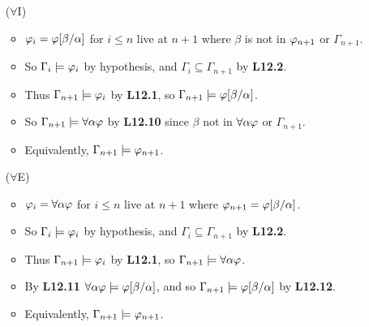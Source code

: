 \documentclass[a4paper, 11pt]{article} %
\begin{document}
\begin{enumerate}[labelsep=.1in]
  \item[($\forall$I)] %
    \begin{itemize}
      \item $\varphi_i=\varphi[\beta/\alpha]$ for $i\leq n$ live at $n+1$ where $\beta$ is not in $\varphi_{n+1}$ or $\Gamma_{n+1}$. 
      \item So $\Gamma_i\models\varphi_i$ by hypothesis, and $\Gamma_i\subseteq\Gamma_{n+1}$ by \textbf{L12.2}.
      \item Thus $\Gamma_{n+1}\models\varphi_i$ by \textbf{L12.1}, so $\Gamma_{n+1}\models\varphi[\beta/\alpha]$.
      \item So $\Gamma_{n+1}\models \forall \alpha\varphi$ by \textbf{L12.10} since $\beta$ not in $\forall \alpha\varphi$ or $\Gamma_{n+1}$.
      \item Equivalently, $\Gamma_{n+1}\models \varphi_{n+1}$.
    \end{itemize}
  \item[($\forall$E)] %
    \begin{itemize}
      \item $\varphi_i=\forall \alpha\varphi$ for $i\leq n$ live at $n+1$ where $\varphi_{n+1}=\varphi[\beta/\alpha]$.
      \item So $\Gamma_i\models\varphi_i$ by hypothesis, and $\Gamma_i\subseteq\Gamma_{n+1}$ by \textbf{L12.2}.
      \item Thus $\Gamma_{n+1}\models\varphi_i$ by \textbf{L12.1}, so $\Gamma_{n+1}\models \forall \alpha\varphi$.
      \item By \textbf{L12.11} $\forall \alpha\varphi\models\varphi[\beta/\alpha]$, and so $\Gamma_{n+1}\models\varphi[\beta/\alpha]$ by \textbf{L12.12}.
      \item Equivalently, $\Gamma_{n+1}\models \varphi_{n+1}$.
    \end{itemize}
\end{enumerate}
\end{document}
